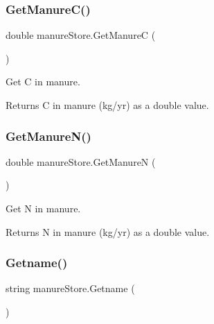 \subsubsection{\texorpdfstring{GetManureC()}{GetManureC()}}
{\footnotesize\ttfamily double manure\+Store.\+Get\+ManureC (\begin{DoxyParamCaption}{ }\end{DoxyParamCaption})\hspace{0.3cm}{\ttfamily [inline]}}



Get C in manure. 

\begin{DoxyReturn}{Returns}
C in manure (kg/yr) as a double value. 
\end{DoxyReturn}
\mbox{\label{classmanure_store_a8013be8424d3ea1875bab33f4ca48089}} 
\subsubsection{\texorpdfstring{GetManureN()}{GetManureN()}}
{\footnotesize\ttfamily double manure\+Store.\+Get\+ManureN (\begin{DoxyParamCaption}{ }\end{DoxyParamCaption})\hspace{0.3cm}{\ttfamily [inline]}}



Get N in manure. 

\begin{DoxyReturn}{Returns}
N in manure (kg/yr) as a double value. 
\end{DoxyReturn}
\mbox{\label{classmanure_store_a06d53dd5f1bd637c0f27c968ef63f8cf}} 
\subsubsection{\texorpdfstring{Getname()}{Getname()}}
{\footnotesize\ttfamily string manure\+Store.\+Getname (\begin{DoxyParamCaption}{ }\end{DoxyParamCaption})\hspace{0.3cm}{\ttfamily [inline]}}




